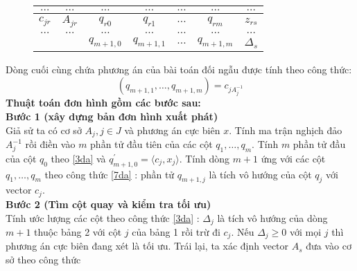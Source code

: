 \documentclass{article}
\begin{document}
\begin{enumerate}
\begin{figure}
\begin{center}
\begin{tabular}{|c|c|c|c|c|c|c|}
                                            \hline
                                            $\ldots$ & $\ldots$ & $\ldots$ & $\ldots$ & $\ldots$ & $\ldots$ & $\ldots$ \\
                                            \hline
                                            $c_{jr}$ & $A_{jr}$ & $q_{r0}$ & $q_{r1}$ & $\ldots$ & $q_{rm}$ & $z_{rs}$ \\
                                            \hline
                                            $\ldots$ & $\ldots$ & $\ldots$ & $\ldots$ & $\ldots$ & $\ldots$ & $\ldots$ \\
                                            \hline
                                            && $q_{m+1,0}$ & $q_{m+1,1}$ & $\ldots$ & $q_{m+1,m}$ & $\Delta_s$ \\
                                            \hline    
                                        \end{tabular}
                                    \end{center}  
                            \end{figure}  
                        Dòng cuối cùng chứa phương án của bài toán đối ngẫu được tính theo công thức:
                            \begin{equation} \label{7da}
                                (q_{m+1,1},\ldots,q_{m+1,m})=c_{jA}_j^{-1}
                            \end{equation}
                        \textbf{Thuật toán đơn hình gồm các bước sau:} \\
                            \textbf{Bước 1 (xây dựng bản đơn hình xuất phát)}\\
                                Giả sử ta có cơ sở $A_j,j \in J$ và phương án cực biên $x$. Tính ma trận nghịch đảo $A_j^{-1}$ rồi điền vào $m$ phần tử đầu tiên của các cột $q_1,\ldots,q_m$. Tính $m$ phần tử đầu của cột $q_0$ theo \eqref{3da} và $q_{m+1,0}^{'}=\langle c_j,x_j \rangle$. Tính dòng $m+1$ ứng với các cột $q_1,\ldots,q_m$ theo công thức \eqref{7da} : phần tử $q_{m+1,j}$ là tích vô hướng của cột $q_j$ với vector $c_j$. \\
                            \textbf{Bước 2 (Tìm cột quay và kiểm tra tối ưu)}\\
                                Tính ước lượng các cột theo công thức \eqref{3da} : $\Delta_j$ là tích vô hướng của dòng $m+1$ thuộc bảng 2 với cột $j$ của bảng 1 rồi trừ đi $c_j$. Nếu $\Delta_j \geq 0$ với mọi $j$ thì phương án cực biên đang xét là tối ưu. Trái lại, ta xác định vector $A_s$ đưa vào cơ sở theo công thức

\end{enumerate}
\end{document}
